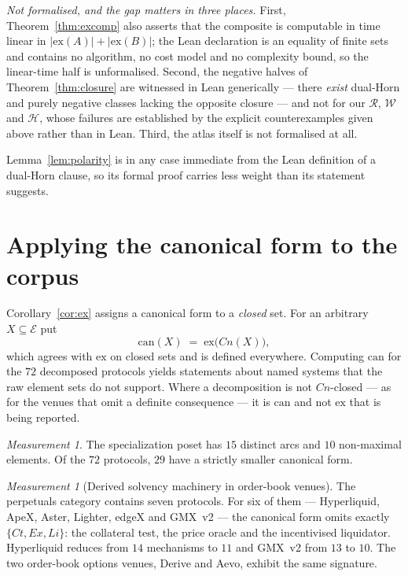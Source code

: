 \documentclass[11pt,reqno]{amsart}
\theoremstyle{plain}
\theoremstyle{definition}
\theoremstyle{remark}
\newtheorem{measurement}[theorem]{Measurement}
\newcommand{\El}{\mathcal{E}}
\begin{document}
\emph{Not formalised, and the gap matters in three places.} First,
Theorem~\ref{thm:excomp} also asserts that the composite is computable in time
linear in $|\mathrm{ex}(A)| + |\mathrm{ex}(B)|$; the Lean declaration is an
equality of finite sets and contains no algorithm, no cost model and no
complexity bound, so the linear-time half is unformalised. Second, the negative
halves of Theorem~\ref{thm:closure} are witnessed in Lean generically --- there
\emph{exist} dual-Horn and purely negative classes lacking the opposite closure
--- and not for our $\mathcal{R}$, $\mathcal{W}$ and $\mathcal{H}$, whose
failures are established by the explicit counterexamples given above rather than
in Lean. Third, the atlas itself is not formalised at all.

Lemma~\ref{lem:polarity} is in any case immediate from the Lean definition of a
dual-Horn clause, so its formal proof carries less weight than its statement
suggests.

\section{Applying the canonical form to the corpus}\label{sec:apply}

Corollary~\ref{cor:ex} assigns a canonical form to a \emph{closed} set. For an
arbitrary $X \subseteq \El$ put
\[
  \mathrm{can}(X) \;=\; \mathrm{ex}\bigl(Cn(X)\bigr),
\]
which agrees with $\mathrm{ex}$ on closed sets and is defined everywhere.
Computing $\mathrm{can}$ for the $72$ decomposed protocols yields statements
about named systems that the raw element sets do not support. Where a
decomposition is not $Cn$-closed --- as for the venues that omit a definite
consequence --- it is $\mathrm{can}$ and not $\mathrm{ex}$ that is being
reported.

\begin{measurement}\label{meas:compress}
The specialization poset has $15$ distinct arcs and $10$ non-maximal elements. Of
the $72$ protocols, $29$ have a strictly smaller canonical form.
\end{measurement}

\begin{measurement}[Derived solvency machinery in order-book venues]\label{meas:perps}
The perpetuals category contains seven protocols. For six of them --- Hyperliquid,
ApeX, Aster, Lighter, edgeX and GMX~v2 --- the canonical form omits exactly
$\{Ct, Ex, Li\}$: the collateral test, the price oracle and the incentivised
liquidator. Hyperliquid reduces from $14$ mechanisms to $11$ and GMX~v2 from $13$
to $10$. The two order-book options venues, Derive and Aevo, exhibit the same
signature.
\end{measurement}
\end{document}
